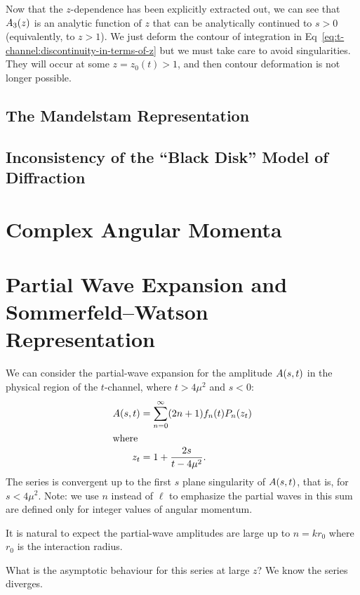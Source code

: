 \M[-1] Now that the $z$-dependence has been explicitly extracted out, we can
see that $A_{3}(z)$ is an analytic function of $z$ that can be
analytically continued to $s>0$ (equivalently, to $z>1$).
We just deform the contour of integration in Eq~\eqref{eq:t-channel:discontinuity-in-terms-of-z}
but we must take care to avoid singularities. They will occur at some
$z=z_{0}(t)>1$, and then contour deformation is not longer possible.

\subsection{The Mandelstam Representation}

\subsection{Inconsistency of the ``Black Disk'' Model of Diffraction}

\section{Complex Angular Momenta}


\section{Partial Wave Expansion and Sommerfeld--Watson Representation}

\M We can consider the partial-wave expansion for the amplitude
$A(s,t)$ in the physical region of the $t$-channel, where
$t>4\mu^{2}$ and $s<0$:
\begin{subequations}
  \begin{align}
    A(s,t) &= \sum^{\infty}_{n=0}(2n+1)f_{n}(t)P_{n}(z_{t})\\
    \intertext{where}
    z_{t} &= 1 + \frac{2s}{t-4\mu^{2}}.
  \end{align}
\end{subequations}
The series is convergent up to the first $s$ plane singularity of
$A(s,t)$, that is, for $s<4\mu^{2}$. Note: we use $n$
instead of $\ell$ to emphasize the partial waves in this sum are defined
only for integer values of angular momentum.

\M It is natural to expect the partial-wave amplitudes are large up to
$n=kr_{0}$ where $r_{0}$ is the interaction radius.

What is the asymptotic behaviour for this series at large $z$? We know
the series diverges.

